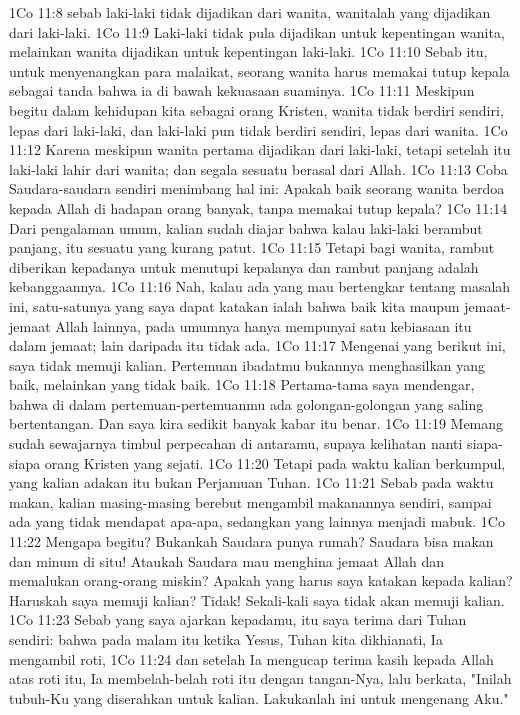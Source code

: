1Co 11:8  sebab laki-laki tidak dijadikan dari wanita, wanitalah yang dijadikan dari laki-laki.
1Co 11:9  Laki-laki tidak pula dijadikan untuk kepentingan wanita, melainkan wanita dijadikan untuk kepentingan laki-laki.
1Co 11:10  Sebab itu, untuk menyenangkan para malaikat, seorang wanita harus memakai tutup kepala sebagai tanda bahwa ia di bawah kekuasaan suaminya.
1Co 11:11  Meskipun begitu dalam kehidupan kita sebagai orang Kristen, wanita tidak berdiri sendiri, lepas dari laki-laki, dan laki-laki pun tidak berdiri sendiri, lepas dari wanita.
1Co 11:12  Karena meskipun wanita pertama dijadikan dari laki-laki, tetapi setelah itu laki-laki lahir dari wanita; dan segala sesuatu berasal dari Allah.
1Co 11:13  Coba Saudara-saudara sendiri menimbang hal ini: Apakah baik seorang wanita berdoa kepada Allah di hadapan orang banyak, tanpa memakai tutup kepala?
1Co 11:14  Dari pengalaman umum, kalian sudah diajar bahwa kalau laki-laki berambut panjang, itu sesuatu yang kurang patut.
1Co 11:15  Tetapi bagi wanita, rambut diberikan kepadanya untuk menutupi kepalanya dan rambut panjang adalah kebanggaannya.
1Co 11:16  Nah, kalau ada yang mau bertengkar tentang masalah ini, satu-satunya yang saya dapat katakan ialah bahwa baik kita maupun jemaat-jemaat Allah lainnya, pada umumnya hanya mempunyai satu kebiasaan itu dalam jemaat; lain daripada itu tidak ada.
1Co 11:17  Mengenai yang berikut ini, saya tidak memuji kalian. Pertemuan ibadatmu bukannya menghasilkan yang baik, melainkan yang tidak baik.
1Co 11:18  Pertama-tama saya mendengar, bahwa di dalam pertemuan-pertemuanmu ada golongan-golongan yang saling bertentangan. Dan saya kira sedikit banyak kabar itu benar.
1Co 11:19  Memang sudah sewajarnya timbul perpecahan di antaramu, supaya kelihatan nanti siapa-siapa orang Kristen yang sejati.
1Co 11:20  Tetapi pada waktu kalian berkumpul, yang kalian adakan itu bukan Perjamuan Tuhan.
1Co 11:21  Sebab pada waktu makan, kalian masing-masing berebut mengambil makanannya sendiri, sampai ada yang tidak mendapat apa-apa, sedangkan yang lainnya menjadi mabuk.
1Co 11:22  Mengapa begitu? Bukankah Saudara punya rumah? Saudara bisa makan dan minum di situ! Ataukah Saudara mau menghina jemaat Allah dan memalukan orang-orang miskin? Apakah yang harus saya katakan kepada kalian? Haruskah saya memuji kalian? Tidak! Sekali-kali saya tidak akan memuji kalian.
1Co 11:23  Sebab yang saya ajarkan kepadamu, itu saya terima dari Tuhan sendiri: bahwa pada malam itu ketika Yesus, Tuhan kita dikhianati, Ia mengambil roti,
1Co 11:24  dan setelah Ia mengucap terima kasih kepada Allah atas roti itu, Ia membelah-belah roti itu dengan tangan-Nya, lalu berkata, "Inilah tubuh-Ku yang diserahkan untuk kalian. Lakukanlah ini untuk mengenang Aku."
